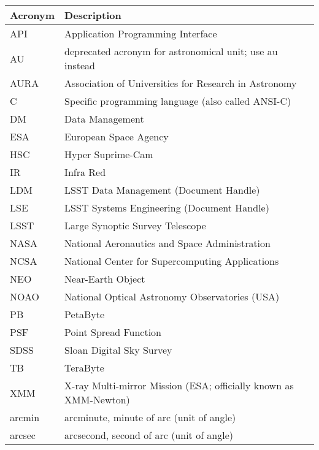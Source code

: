 \addtocounter{table}{-1}
\begin{longtable}{|l|p{}|}\hline
\textbf{Acronym} & \textbf{Description}  \\\hline

API & Application Programming Interface \\\hline
AU & deprecated acronym for astronomical unit; use au instead \\\hline
AURA & Association of Universities for Research in Astronomy \\\hline
C & Specific programming language (also called ANSI-C) \\\hline
DM & Data Management \\\hline
ESA & European Space Agency \\\hline
HSC & Hyper Suprime-Cam \\\hline
IR & Infra Red \\\hline
LDM & LSST Data Management (Document Handle) \\\hline
LSE & LSST Systems Engineering (Document Handle) \\\hline
LSST & Large Synoptic Survey Telescope \\\hline
NASA & National Aeronautics and Space Administration \\\hline
NCSA & National Center for Supercomputing Applications \\\hline
NEO & Near-Earth Object \\\hline
NOAO & National Optical Astronomy Observatories (USA) \\\hline
PB & PetaByte \\\hline
PSF & Point Spread Function \\\hline
SDSS & Sloan Digital Sky Survey \\\hline
TB & TeraByte \\\hline
XMM & X-ray Multi-mirror Mission (ESA; officially known as XMM-Newton) \\\hline
arcmin & arcminute, minute of arc (unit of angle) \\\hline
arcsec & arcsecond, second of arc (unit of angle) \\\hline
\end{longtable}

